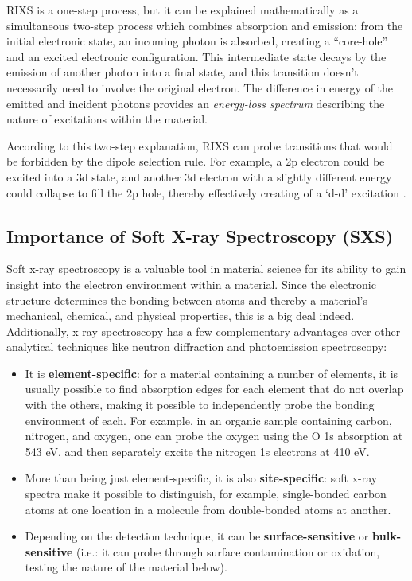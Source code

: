 RIXS is a one-step process, but it can be explained mathematically as a simultaneous two-step process which combines absorption and emission: from the initial electronic state, an incoming photon is absorbed, creating a ``core-hole'' and an excited electronic configuration.  This intermediate state decays by the emission of another photon into a final state, and this transition doesn't necessarily need to involve the original electron.  The difference in energy of the emitted and incident photons provides an \emph{energy-loss spectrum} describing the nature of excitations within the material.

According to this two-step explanation, RIXS can probe transitions that would be forbidden by the dipole selection rule. For example, a 2p electron could be excited into a 3d state, and another 3d electron with a slightly different energy could collapse to fill the 2p hole, thereby effectively creating of a `d-d' excitation \cite{But96}.
\subsection{Importance of Soft X-ray Spectroscopy (SXS)}
Soft x-ray spectroscopy is a valuable tool in material science for its ability to gain insight into the electron environment within a material.  Since the electronic structure determines the bonding between atoms and thereby a material's mechanical, chemical, and physical properties, this is a big deal indeed.  Additionally, x-ray spectroscopy has a few complementary advantages over other analytical techniques like neutron diffraction and photoemission spectroscopy:
\begin{itemize}
\item It is \textbf{element-specific}: for a material containing a number of elements, it is usually possible to find absorption edges for each element that do not overlap with the others, making it possible to independently probe the bonding environment of each.  For example, in an organic sample containing carbon, nitrogen, and oxygen, one can  probe the oxygen using the O 1s absorption at 543 eV, and then separately excite the nitrogen 1s electrons at 410 eV.
\item More than being just element-specific, it is also \textbf{site-specific}: soft x-ray spectra make it possible to distinguish, for example, single-bonded carbon atoms at one location in a molecule from double-bonded atoms at another.
\item Depending on the detection technique, it can be \textbf{surface-sensitive} or \textbf{bulk-sensitive} (i.e.: it can probe through surface contamination or oxidation, testing the nature of the material below).
\end{itemize}

